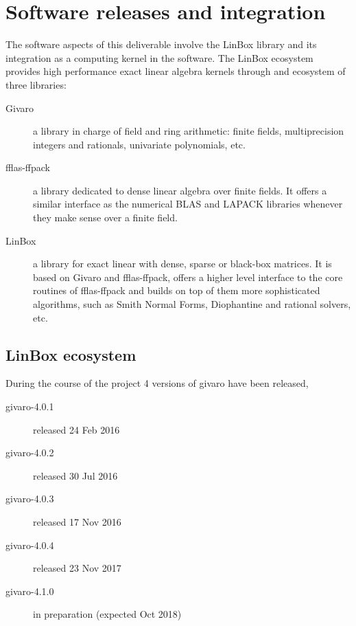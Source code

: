 \documentclass{deliverablereport}
\begin{document}
\section{Software releases and integration}

The software aspects of this deliverable involve the LinBox library
and its integration as a computing kernel in the \Sage software.
The LinBox ecosystem provides high performance exact linear algebra kernels
through and ecosystem of three libraries:
\begin{description}
  \item[Givaro] a library in charge of field and ring arithmetic: finite
    fields, multiprecision integers and rationals, univariate polynomials, etc.
  \item[fflas-ffpack] a library dedicated to dense linear algebra over finite
    fields. It offers a similar interface as the numerical BLAS and LAPACK
    libraries whenever they make sense over a finite field.
  \item[LinBox] a library for exact linear with dense, sparse or black-box
    matrices. It is based on Givaro and fflas-ffpack, offers a higher level interface
    to the core routines of fflas-ffpack and builds on top of them more
    sophisticated algorithms, such as Smith Normal Forms, Diophantine and
    rational solvers, etc.
  \end{description}

\subsection{LinBox ecosystem}

During the course of the project 4 versions of givaro have been released, 
\begin{description}
  \item[givaro-4.0.1] released 24 Feb 2016
  \item[givaro-4.0.2] released 30 Jul 2016
  \item[givaro-4.0.3] released 17 Nov 2016
  \item[givaro-4.0.4] released 23 Nov 2017
  \item[givaro-4.1.0] in preparation (expected Oct 2018)
\end{description}
\end{document}
